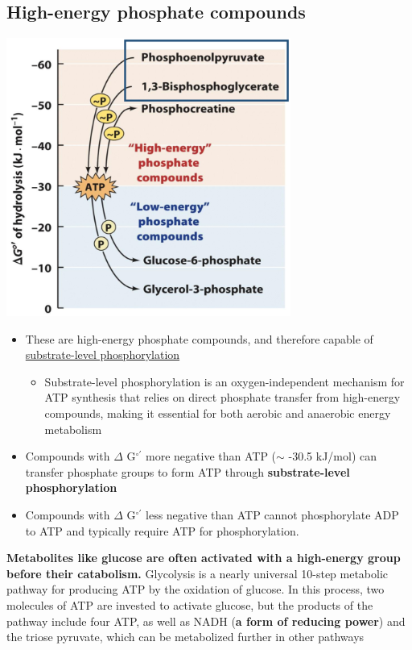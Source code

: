\documentclass[10pt]{article}
\begin{document}
\subsection*{High-energy phosphate compounds}
\begin{center}
    \includegraphics*[width=0.7\textwidth]{L3_4.png}
\end{center}
\begin{itemize}
	\item These are high-energy phosphate compounds, and therefore capable of \underline{substrate-level phosphorylation}
	\begin{itemize}
        \item Substrate-level phosphorylation is an oxygen-independent mechanism for ATP synthesis that relies on direct phosphate transfer from high-energy compounds, making it essential for both aerobic and anaerobic energy metabolism
    \end{itemize}
    \item Compounds with $\Delta$ G$^{\circ '}$ more negative than ATP ($\sim$ -30.5 kJ/mol) can transfer phosphate groups to form ATP through \textbf{substrate-level phosphorylation}
    \item Compounds with $\Delta$ G$^{\circ '}$ less negative than ATP cannot phosphorylate ADP to ATP and typically require ATP for phosphorylation.
\end{itemize}
\textbf{Metabolites like glucose are often activated with a high-energy group before their catabolism.} Glycolysis is a nearly universal 10-step metabolic pathway for producing ATP by the oxidation of glucose. In this process, two molecules of ATP are invested to activate glucose, but the products of the pathway include four ATP, as well as NADH (\textbf{a form of reducing power}) and the triose pyruvate, which can be metabolized further in other pathways
\end{document}
